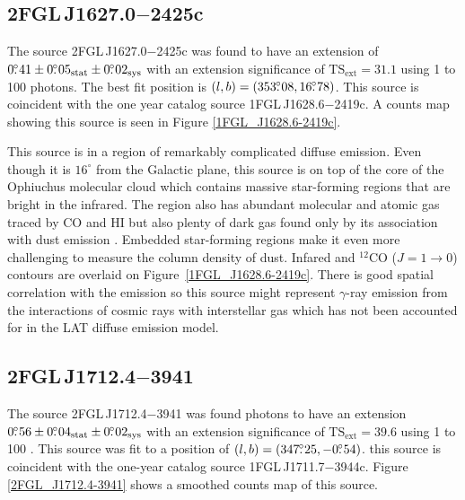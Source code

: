 \documentclass[12pt,preprint]{aastex}
\newcommand{\gev}{\text{GeV}\xspace}
\newcommand{\tsext}{{\ensuremath{\text{TS}_{\text{ext}}}}\xspace}
\newcommand{\sys}{\text{sys}\xspace}
\newcommand{\stat}{\text{stat}\xspace}
\newcommand{\degree}{^\circ\xspace}
\newcommand{\hl}[1]{#1}
\begin{document}
\subsection{2FGL\,J1627.0$-$2425c}
\label{section_2FGL_J1627.0-2425c}


The source 2FGL\,J1627.0$-$2425c was found  to
have an extension of $0\fdg41\pm0\fdg05_\stat\pm0\fdg02_\sys$ with
an extension significance of $\tsext=31.1$
using 1 \gev to 100 \gev photons.  The best fit position is
$(l,b)=(353\mbox{$.\!\!^\circ$}08, 16\mbox{$.\!\!^\circ$}78)$.  This source is coincident with the one
year catalog source 1FGL\,J1628.6$-$2419c.  A counts map showing this source
is seen in Figure \ref{1FGL_J1628.6-2419c}.  

\hl{
This source is in a region of remarkably complicated diffuse emission.
Even though it is $16\degree$ from the Galactic plane, this source is on
top of the core of the Ophiuchus molecular cloud which contains massive
star-forming regions that are bright in the infrared.  The region also has
abundant molecular and atomic gas traced by CO and HI but also plenty of
dark gas found only by its association with dust emission
\citep{isabelle_dark_gass}. Embedded star-forming regions make it even
more challenging to measure the column density of dust.  Infared and 
${}^{12}\text{CO}$ ($J=1\rightarrow 0$)
contours are overlaid on Figure~\ref{1FGL_J1628.6-2419c}. There is good
spatial correlation with the \gev emission \citep{iras_rho_ophiuci,co_rho_ophiuci}
so this source might 
represent $\gamma$-ray emission from the interactions of cosmic rays with
interstellar gas which has not been accounted for in the LAT diffuse
emission model.
}

\subsection{2FGL\,J1712.4$-$3941}
\label{section_2FGL_J1712.4-3941}


The source 2FGL\,J1712.4$-$3941 was found 
photons to have an extension $0\fdg56\pm0\fdg04_\stat\pm0\fdg02_\sys$
with an extension significance of $\tsext=39.6$
using 1 \gev to 100 \gev.  This source was
fit to a position of $(l,b)=(347\mbox{$.\!\!^\circ$}25,-0\mbox{$.\!\!^\circ$}54)$.  this source
is coincident with the one-year catalog source 1FGL\,J1711.7$-$3944c.
Figure \ref{2FGL_J1712.4-3941} shows a smoothed counts map of this source.
\end{document}
